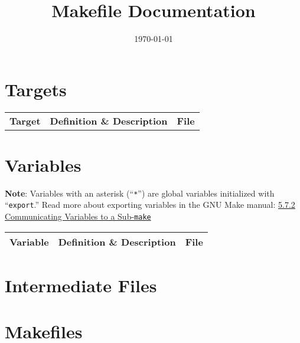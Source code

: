 \documentclass[oneside,11pt]{memoir}
\title{Makefile Documentation}
\date{\today}
\author{}
\begin{document}
	
	
	\begin{center}
	\end{center}
	
	\section{Targets}
	\label{targets}
	
	\begin{longtabu} to 
		\textbf{Target} & \textbf{Definition \& Description} & \textbf{File} \\
		
				
		
	\end{longtabu}
	
	\section{Variables}
	\label{variables}

        \textbf{Note}: Variables with an asterisk (``\texttt{*}'') are global variables
        initialized with ``\texttt{export}.'' Read more about exporting variables in
        the GNU Make manual: \href{https://www.gnu.org/software/make/manual/html_node/%
          Variables_002fRecursion.html}{5.7.2
          Communicating Variables to a Sub-\texttt{make}}
			
	
	\begin{longtabu} to 
		\textbf{Variable} & \textbf{Definition \& Description} & \textbf{File} \\
		
				
		
		\bottomrule
	\end{longtabu}
	
	\section{Intermediate Files}
	\label{intermediates}

	\begin{description}		
						
	\end{description}
	
	\newpage
	\section{Makefiles}
	\label{makefiles}
		
		
	
	
\end{document}
